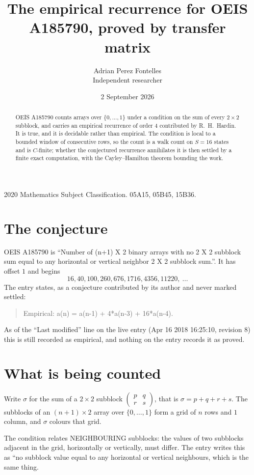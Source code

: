 \documentclass[11pt,a4paper]{article}
\title{The empirical recurrence for OEIS A185790, proved by transfer matrix}
\author{Adrian Perez Fontelles\\ \small Independent researcher}
\date{2 September 2026}
\theoremstyle{plain}
\theoremstyle{definition}
\begin{document}
\maketitle

\begin{abstract}
OEIS A185790 counts arrays over $\{0,\dots,1\}$ under a condition on the sum of every
$2\times2$ subblock, and carries an empirical recurrence of order $4$ contributed by
R.~H.~Hardin. It is true, and it is decidable rather than empirical. The condition is local to
a bounded window of consecutive rows, so the count is a walk count on $S=16$ states and is
$C$-finite; whether the conjectured recurrence annihilates it is then settled by a finite exact
computation, with the Cayley--Hamilton theorem bounding the work.
\end{abstract}

\noindent\small 2020 Mathematics Subject Classification. 05A15, 05B45, 15B36.\normalsize

\section{The conjecture}

OEIS A185790 is ``Number of (n+1) X 2 binary arrays with no 2 X 2 subblock sum equal to any horizontal or vertical neighbor 2 X 2 subblock sum.''. It has offset $1$ and begins
\[
16, 40, 100, 260, 676, 1716, 4356, 11220,\ \dots
\]
The entry states, as a conjecture contributed by its author and never marked settled:
\begin{quote}
Empirical: a(n) = a(n-1) + 4*a(n-3) + 16*a(n-4).
\end{quote}
As of the ``Last modified'' line on the live entry (Apr 16 2018 16:25:10, revision 8) this is still
recorded as empirical, and nothing on the entry records it as proved.

\section{What is being counted}

Write $\sigma$ for the sum of a $2\times2$ subblock
$\begin{pmatrix}p&q\\r&s\end{pmatrix}$, that is $\sigma=p+q+r+s$. The subblocks of an
$(n+1)\times2$ array over $\{0,\dots,1\}$ form a grid of $n$ rows and $1$
column, and $\sigma$ colours that grid.

The condition relates NEIGHBOURING subblocks: the values of two subblocks adjacent in the grid,
horizontally or vertically, must differ. The entry writes this as ``no subblock value equal to any horizontal or vertical neighbours, which is the same thing.
\end{document}
